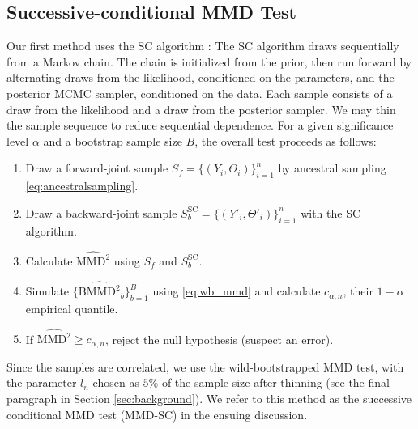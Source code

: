 \documentclass{article}
\begin{document}
\subsection{Successive-conditional MMD Test}
Our first method uses the SC algorithm \cite{geweke_getting_2004}:
The SC algorithm draws sequentially from a Markov chain. The chain is initialized from the prior, then run forward by alternating draws from the likelihood, conditioned on the parameters, and the posterior MCMC sampler, conditioned on the data. 
Each sample consists of a draw from the likelihood and a draw from the posterior sampler.
We may thin the sample sequence to reduce sequential dependence. 
For a given significance level $\alpha$ and a bootstrap sample size $B$, the overall test proceeds as follows: 
\begin{enumerate}
    \item Draw a forward-joint sample $S_f=\{(Y_i,\Theta_i)\}_{i=1}^n$ by ancestral sampling \eqref{eq:ancestralsampling}.
    \item Draw a backward-joint sample $S_{b}^{\mathrm{SC}}=\{(Y'_i, \Theta'_{i})\}_{i=1}^{n}$ with the SC algorithm.
    \item Calculate $\widehat{\mathrm{MMD}^2}$ using $S_f$ and $S_b^{\mathrm{SC}}$.
    \item Simulate $\{\widehat{\mathrm{BMMD}^2}_{b}\}_{b=1}^{B}$ using \eqref{eq:wb_mmd} and calculate $c_{\alpha, n}$, their $1-\alpha$ empirical quantile.
    \item If $\widehat{\mathrm{MMD}^2} \geq c_{\alpha, n}$, reject the null hypothesis (suspect an error).
\end{enumerate}
Since the samples are correlated, we use the wild-bootstrapped MMD test, with
the parameter $l_n$ chosen as $5\%$ of the sample size after thinning (see the final paragraph in Section \ref{sec:background}).
We refer to this method as the successive conditional MMD test (MMD-SC) in the ensuing discussion.
\end{document}
